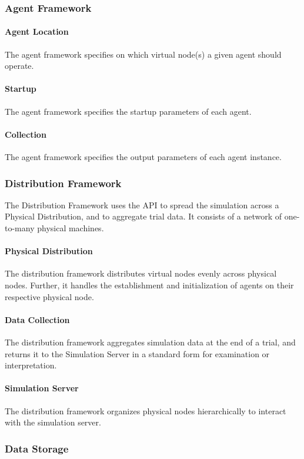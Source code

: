 \documentclass[titlepage]{article}
\begin{document}
\subsubsection{Agent Framework}
	\paragraph{Agent Location} The agent framework specifies on which virtual node(s) a given agent should operate.
	\paragraph{Startup} The agent framework specifies the startup parameters of each agent.
	\paragraph{Collection} The agent framework specifies the output parameters of each agent instance.

\subsubsection{Distribution Framework}
	The Distribution Framework uses the API to spread the simulation across a Physical Distribution, and to aggregate trial data. It consists of a network of one-to-many physical machines.
	\paragraph{Physical Distribution} The distribution framework distributes virtual nodes evenly across physical nodes. Further, it handles the establishment and initialization of agents on their respective physical node.
	\paragraph{Data Collection} The distribution framework aggregates simulation data at the end of a trial, and returns it to the Simulation Server in a standard form for examination or interpretation.
	\paragraph{Simulation Server} The distribution framework organizes physical nodes hierarchically to interact with the simulation server.


\subsubsection{Data Storage%
  \label{data-storage}%
}
\end{document}

